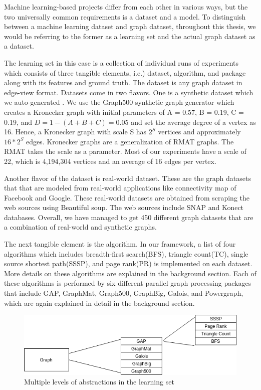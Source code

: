 Machine learning-based projects differ from each other in various ways, but the two universally common requirements is a dataset and a model. To distinguish between a machine learning dataset and graph dataset, throughout this thesis, we would be referring to the former as a learning set and the actual graph dataset as a dataset.

The learning set in this case is a collection of individual runs of experiments which consists of three tangible elements, i.e.) dataset, algorithm, and package along with its features and ground truth. The dataset is any graph dataset in edge-view format. Datasets come in two flavors. One is a synthetic dataset which we auto-generated . We use the Graph500 synthetic graph generator which creates a Kronecker graph with initial parameters of A = 0.57, B = 0.19, C = 0.19, and $D = 1 − (A + B + C) = 0.05$ and set the average degree of a vertex as 16. Hence, a Kronecker graph with scale S has $2^S$ vertices and approximately $16 * 2^S$ edges. Kronecker graphs are a generalization of RMAT graphs. The RMAT takes the scale as a parameter. Most of our experiments have a scale of 22, which is 4,194,304 vertices and an average of 16 edges per vertex. 

Another flavor of the dataset is real-world dataset. These are the graph datasets that that are modeled from real-world applications like connectivity map of Facebook and Google. These real-world datasets are obtained from scraping the web sources using Beautiful soup. The web sources include SNAP and Konect databases. Overall, we have managed to get 450 different graph datasets that are a combination of real-world and synthetic graphs.

The next tangible element is the algorithm. In our framework, a list of four algorithms which includes breadth-first search(BFS), triangle count(TC), single source shortest path(SSSP), and page rank(PR) is implemented on each dataset. More details on these algorithms are explained in the background section. Each of these algorithms is performed by six different parallel graph processing packages that include GAP, GraphMat, Graph500, GraphBig, Galois, and Powergraph, which are again explained in detail in the background section.

\begin{figure}
    \centering
    \includegraphics[width=1\columnwidth]{figures/dataset_flow.png}
    \caption{Multiple levels of abstractions in the learning set}
    \label{dataset_flow}
\end{figure}

